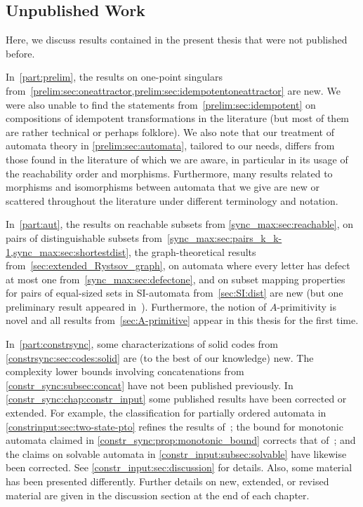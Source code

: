\subsection{Unpublished Work} 
\label{overview:sec:unpublished}

Here, we discuss results contained in the present thesis that were not published before.

In~\cref{part:prelim}, the results on one-point singulars 
from~\cref{prelim:sec:oneattractor,prelim:sec:idempotentoneattractor}
are new. We were also unable to find the statements 
from~\cref{prelim:sec:idempotent} on compositions
of idempotent transformations in the literature (but most of them are rather technical or perhaps folklore). We also note that our treatment of automata theory in \cref{prelim:sec:automata}, tailored to our needs, 
differs from those found in the literature of which we are aware,
in particular in its usage of the reachability order
and morphisms. Furthermore, many results related to morphisms
and isomorphisms between automata that
we give are new or scattered throughout the literature under different terminology and notation.

In~\cref{part:aut}, the results on reachable subsets from \cref{sync_max:sec:reachable},
on pairs of distinguishable subsets from~\cref{sync_max:sec:pairs_k_k-1,sync_max:sec:shortestdist},
the graph-theoretical results from~\cref{sec:extended_Rystsov_graph}, 
on automata where every letter has defect at most one from~\cref{sync_max:sec:defectone},
and on subset mapping properties for pairs
of equal-sized sets in SI-automata from~\cref{sec:SI:dist} are new (but one preliminary 
result appeared in~\cite[Lem.~11]{DBLP:conf/dcfs/Hoffmann22}).
Furthermore, the notion of $A$-primitivity is novel
and all results from~\cref{sec:A-primitive} 
appear in this thesis for the first time.

In~\cref{part:constrsync}, some characterizations
of solid codes from \cref{constrsync:sec:codes:solid} are (to the best of our knowledge) new.
The complexity lower bounds involving concatenations from \cref{constr_sync:subsec:concat} have not been published previously.
In \cref{constr_sync:chap:constr_input} some published results have
been corrected or extended. 
For example, the classification for partially ordered automata in \cref{constrinput:sec:two-state-pto} refines the results of~\cite{DBLP:conf/dlt/Hoffmann21a}; the bound for monotonic automata claimed in \cref{constr_sync:prop:monotonic_bound} corrects that of~\cite{DBLP:conf/wia/Hoffmann22}; and the claims on solvable automata in \cref{constr_input:subsec:solvable} have likewise been corrected. See \cref{constr_input:sec:discussion} for details.
Also, some material has been presented differently. Further details on new, extended, or revised material are given in the discussion section at the end of each chapter.
